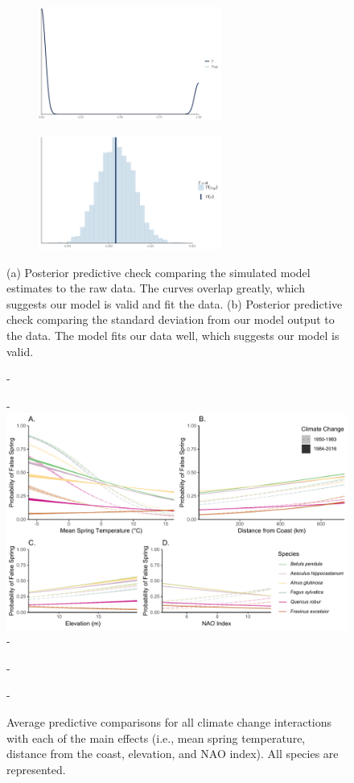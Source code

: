 \documentclass{article}\usepackage[]{graphicx}\usepackage[]{color}
\begin{document}
\begin{figure} [H]
\begin{subfigure}{.5\textwidth}
  \centering
  \includegraphics[width=6cm]{..//figures/PPCs/orig_ppc.png}
  \caption{}
  \label{fig:sfig1}
\end{subfigure}%
\begin{subfigure}{.5\textwidth}
  \centering
  \includegraphics[width=6cm]{..//figures/PPCs/ppc_sd.png}
  \caption{}
  \label{fig:sfig2}
\end{subfigure}
\caption{(a) Posterior predictive check comparing the simulated model estimates to the raw data. The curves overlap greatly, which suggests our model is valid and fit the data. (b) Posterior predictive check comparing the standard deviation from our model output to the data. The model fits our data well, which suggests our model is valid.}
\label{fig:fig}
\end{figure}


{\begin{figure} [H]
  -\begin{center}
  -\includegraphics[width=16cm]{..//figures/APC_allpred_allspp_baseR.pdf}
  -\caption{Average predictive comparisons for all climate change interactions with each of the main effects (i.e., mean spring temperature, distance from the coast, elevation, and NAO index). All species are represented. }\label{fig:tmin}
  -\end{center}
  -\end{figure}}
  
\end{document}
